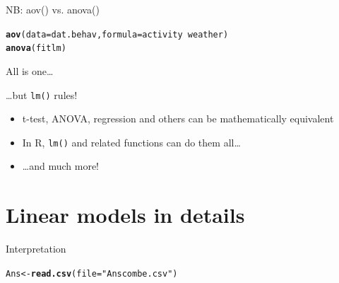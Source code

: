 \documentclass[10pt]{beamer}\usepackage[]{graphicx}\usepackage[]{color}
\makeatletter
\newcommand{\hlstr}[1]{\textcolor[rgb]{0.192,0.494,0.8}{#1}}%
\newcommand{\hlopt}[1]{\textcolor[rgb]{0,0,0}{#1}}%
\newcommand{\hlstd}[1]{\textcolor[rgb]{0.345,0.345,0.345}{#1}}%
\newcommand{\hlkwb}[1]{\textcolor[rgb]{0.69,0.353,0.396}{#1}}%
\newcommand{\hlkwc}[1]{\textcolor[rgb]{0.333,0.667,0.333}{#1}}%
\newcommand{\hlkwd}[1]{\textcolor[rgb]{0.737,0.353,0.396}{\textbf{#1}}}%
\newenvironment{kframe}{%
 \def\at@end@of@kframe{}%
 \ifinner\ifhmode%
  \def\at@end@of@kframe{\end{minipage}}%
  \begin{minipage}{\columnwidth}%
 \fi\fi%
 \def\FrameCommand##1{\hskip\@totalleftmargin \hskip-\fboxsep
 \colorbox{shadecolor}{##1}\hskip-\fboxsep
     \hskip-\linewidth \hskip-\@totalleftmargin \hskip\columnwidth}%
 \MakeFramed {\advance\hsize-\width
   \@totalleftmargin\z@ \linewidth\hsize
   \@setminipage}}%
 {\par\unskip\endMakeFramed%
 \at@end@of@kframe}
\newenvironment{knitrout}{}{} %
\makeatother
\begin{document}
\begin{frame}[fragile]{NB: aov() vs. anova()}

\begin{knitrout}
\color{fgcolor}\begin{kframe}
\begin{alltt}
\hlkwd{aov}\hlstd{(}\hlkwc{data} \hlstd{= dat.behav,} \hlkwc{formula} \hlstd{= activity} \hlopt{~} \hlstd{weather)}
\hlkwd{anova}\hlstd{(fitlm)}
\end{alltt}
\end{kframe}
\end{knitrout}

\end{frame}

\begin{frame}{All is one\dots}
\pause
  \begin{block}{\dots but \texttt{lm()} rules!}
    \begin{itemize}
      \item t-test, ANOVA, regression and others can be mathematically equivalent
      \item In R, \texttt{lm()} and related functions can do them all\dots
      \item \dots and much more!
    \end{itemize}
  \end{block}
\end{frame}

\section{Linear models in details}
\begin{frame}[fragile]{Interpretation}
\begin{knitrout}
\color{fgcolor}\begin{kframe}
\begin{alltt}
  \hlstd{Ans} \hlkwb{<-} \hlkwd{read.csv}\hlstd{(}\hlkwc{file} \hlstd{=} \hlstr{"Anscombe.csv"}\hlstd{)}
\end{alltt}


{\ttfamily\noindent{}}

{\ttfamily\noindent\bfseries{}}\end{kframe}
\end{knitrout}
\end{frame}
\end{document}
